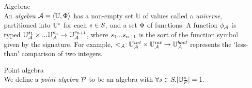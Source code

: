 \vspace{10px}
\begin{definition} Algebrae \\
An \textit{algebra} $\mathcal{A} = \langle \mathbb{U}, \Phi\rangle$ has a non-empty set $\mathbb{U}$ of values called a \textit{universe}, partitioned into $\mathbb{U}^s$ for each $s \in S$, and a set $\Phi$ of functions. A function $\phi_{\mathcal{A}}$ is typed $\mathbb{U}_{\mathcal{A}}^{s_1} \times ... \mathbb{U}_{\mathcal{A}}^{s_n} \rightarrow \mathbb{U}_{\mathcal{A}}^{s_{n+1}}$, where $s_1 ... s_{n+1}$ is the sort of the function symbol given by the signature. For example, $<_{\mathcal{A}}: \mathbb{U}_{\mathcal{A}}^{int} \times \mathbb{U}_{\mathcal{A}}^{int} \rightarrow \mathbb{U}_{\mathcal{A}}^{bool}$ represents the `less-than' comparison of two integers.
\end{definition}

\vspace{10px}
\begin{definition} Point algebra \\
We define a \textit{point algebra} $\mathcal{P}$ to be an algebra with $\forall s \in S . |\mathbb{U}_{\mathcal{P}}^s| = 1$.
\end{definition}

